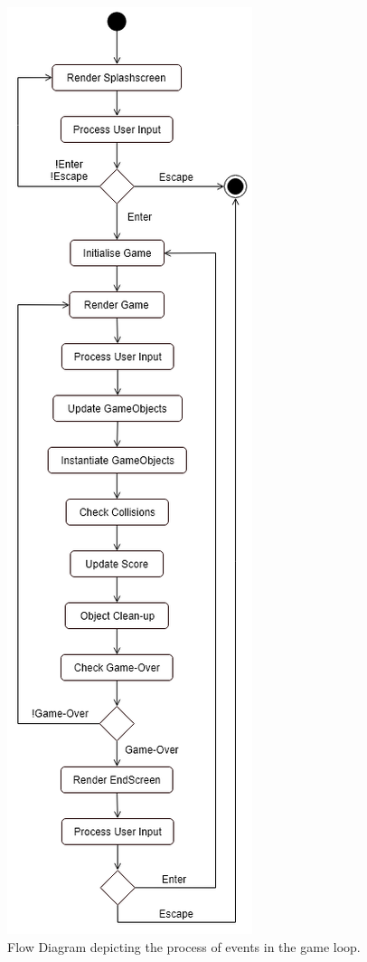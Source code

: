 \documentclass[10pt,twocolumn]{witseiepaper}
\begin{document}
\begin{figure}[H]
	\includegraphics[width=\textwidth,height=\textheight,keepaspectratio]{flowdiagram.png}
	\caption{Flow Diagram depicting the process of events in the game loop.}
	\raggedright
	\label{fig:flowDiagram}
\end{figure}
\end{document}
